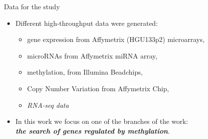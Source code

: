 \documentclass[handout]{beamer}
\begin{document}
\begin{frame}{Data for the study}
  \begin{itemize}
     \item Different high-throughput data were generated:
     \begin{itemize}
       \item gene expression from Affymetrix (HGU133p2) microarrays,
       \item microRNAs from Affymetrix miRNA array,
       \item methylation, from Illumina Beadchips,
       \item Copy Number Variation from Affymetrix Chip,
       \item \emph{RNA-seq data}
     \end{itemize}

    \item In this work we focus on one of the branches of the work: \\
        \textbf{\emph{the search of genes regulated by methylation}}.
  \end{itemize}
\end{frame}

\end{document}
